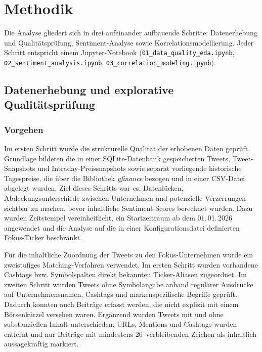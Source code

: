 \section{Methodik}
\label{sec:methodik}

Die Analyse gliedert sich in drei aufeinander aufbauende Schritte: Datenerhebung und Qualitätsprüfung, Sentiment-Analyse sowie Korrelationsmodellierung. Jeder Schritt entspricht einem Jupyter-Notebook (\texttt{01\_data\_quality\_eda.ipynb}, \texttt{02\_sentiment\_analysis.ipynb}, \texttt{03\_correlation\_modeling.ipynb}).

\subsection{Datenerhebung und explorative Qualitätsprüfung}
\label{subsec:eda}

\subsubsection*{Vorgehen}

Im ersten Schritt wurde die strukturelle Qualität der erhobenen Daten geprüft.
Grundlage bildeten die in einer SQLite-Datenbank gespeicherten Tweets, Tweet-Snapshots und Intraday-Preissnapshots sowie separat vorliegende historische Tagespreise, die über die Bibliothek \textit{yfinance} bezogen und in einer CSV-Datei abgelegt wurden. Ziel dieses Schritts war es, Datenlücken, Abdeckungsunterschiede zwischen Unternehmen und potenzielle Verzerrungen sichtbar zu machen, bevor inhaltliche Sentiment-Scores berechnet wurden. Dazu wurden Zeitstempel vereinheitlicht, ein Startzeitraum ab dem 01.\,01.\,2026 angewendet und die Analyse auf die in einer Konfigurationsdatei definierten Fokus-Ticker beschränkt.

Für die inhaltliche Zuordnung der Tweets zu den Fokus-Unternehmen wurde ein zweistufiges Matching-Verfahren verwendet. Im ersten Schritt wurden vorhandene Cashtags bzw. Symbolspalten direkt bekannten Ticker-Aliasen zugeordnet. Im zweiten Schritt wurden Tweets ohne Symbolangabe anhand regulärer Ausdrücke auf Unternehmensnamen, Cashtags und markenspezifische Begriffe geprüft. Dadurch konnten auch Beiträge erfasst werden, die nicht explizit mit einem Börsenkürzel versehen waren. Ergänzend wurden Tweets mit und ohne substanziellen Inhalt unterschieden: URLs, Mentions und Cashtags wurden entfernt und nur Beiträge mit mindestens 20~verbleibenden Zeichen als inhaltlich aussagekräftig markiert.

